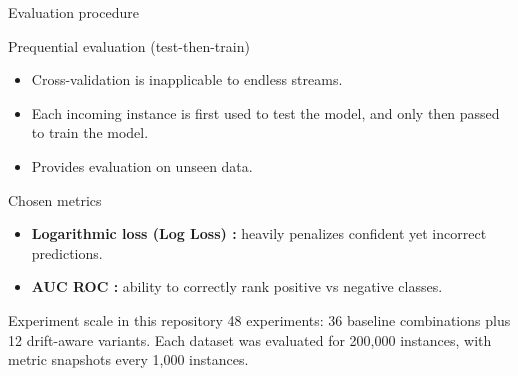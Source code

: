 \documentclass[aspectratio=169,xcolor=dvipsnames]{beamer}
\begin{document}
\begin{frame}{Evaluation procedure}
    \begin{block}{Prequential evaluation (test-then-train)}
    \small
    \begin{itemize}
        \item Cross-validation is inapplicable to endless streams.
        \item Each incoming instance is first used to test the model, and only then passed to train the model. 
        \item Provides evaluation on unseen data.
    \end{itemize}
    \end{block}

    \begin{block}{Chosen metrics}
    \small
    \begin{itemize}
        \item \textbf{Logarithmic loss (Log Loss) \cite{vovk2015fundamental}:} heavily penalizes confident yet incorrect predictions.
        \item \textbf{AUC ROC \cite{fawcett2006introduction}:} ability to correctly rank positive vs negative classes.
    \end{itemize}
    \end{block}

    \begin{alertblock}{Experiment scale in this repository}
    \small
    48 experiments: 36 baseline combinations plus 12 drift-aware variants. Each dataset was evaluated for 200,000 instances, with metric snapshots every 1,000 instances.
    \end{alertblock}
\end{frame}
\end{document}
